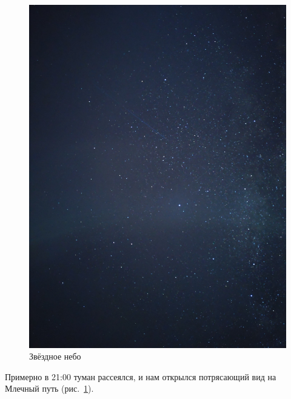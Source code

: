 \begin{figure}[h!]	
	\centering
	\includegraphics[angle=0, width=0.7\linewidth]{../pics/IMG_20240823_205116}
	\caption{Звёздное небо}
	\label{fig:IMG_20240823_205116}
\end{figure}
 
 Примерно в 21:00 туман рассеялся, и нам открылся потрясающий вид на Млечный путь (рис.~\ref{fig:IMG_20240823_205116}).
 
\clearpage

